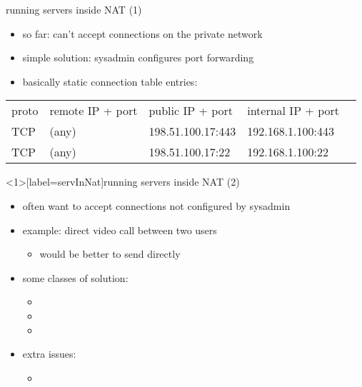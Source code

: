 \begin{frame}{running servers inside NAT (1)}
    \begin{itemize}
    \item so far: can't accept connections on the private network
    \vspace{.5cm}
    \item simple solution: sysadmin configures port forwarding
    \item basically static connection table entries:
    \end{itemize}
\small
\begin{tabular}{l|l|l|l|l}
proto & remote IP + port & public IP  + port & internal IP + port \\
TCP & (any) & 198.51.100.17:443 & 192.168.1.100:443 \\ 
TCP & (any) & 198.51.100.17:22 & 192.168.1.100:22 \\ 
\end{tabular}
\end{frame}

\begin{frame}<1>[label=servInNat]{running servers inside NAT (2)}
    \begin{itemize}
    \item often want to accept connections not configured by sysadmin
    \item example: direct video call between two users
        \begin{itemize}
        \item would be better to send directly
        \end{itemize}
    \vspace{.5cm}
    \item some classes of solution:
        \begin{itemize}
        \item {}
        \item {}
        \item {}
        \end{itemize}
    \item extra issues:
        \begin{itemize}
        \item {}
        \end{itemize}
    \end{itemize}
\end{frame}

